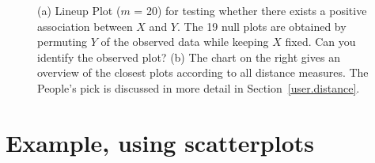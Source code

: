 \documentclass[12]{report}
\begin{document}
\begin{figure}[htbp]
{\label{sca_2}
}
\label{sca_lineup}
	\vspace{-.1in}
\caption[Optional caption for list of figures]{(a) Lineup Plot ($m$ = 20) for testing whether there exists a positive association between $X$ and $Y$. The 19 null plots are obtained by permuting $Y$ of the observed data while keeping $X$ fixed. Can you identify the observed plot?  (b) The chart on the right gives an overview of the closest plots according to all distance measures. The People's pick is discussed in more detail in Section~\ref{user.distance}. }
\end{figure}


%
%
%


\section{Example, using scatterplots} \label{sec:asso}
\end{document}
